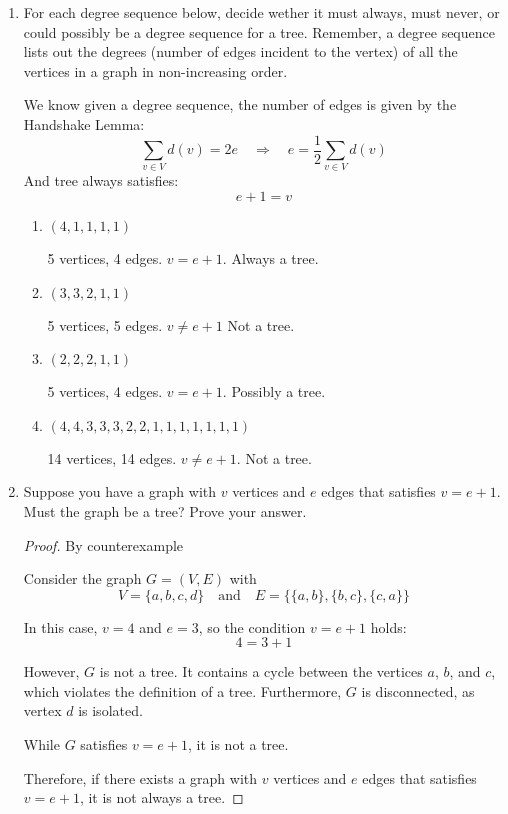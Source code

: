 \documentclass[11pt, letterpaper, includehead]{article}
\theoremstyle{plain}
\theoremstyle{mydefinition}
\theoremstyle{myproperty}
\begin{document}
\begin{enumerate}[label=\textbf{\arabic*}., leftmargin=*]
    \item For each degree sequence below, decide wether it must always, must never, or could possibly be a degree sequence for a tree. Remember, a degree sequence lists out the degrees (number of edges incident to the vertex) of all the vertices in a graph in non-increasing order.
    
    We know given a degree sequence, the number of edges is given by the Handshake Lemma:
        \[
            \sum_{v \in V} d(v) = 2e \quad \Rightarrow \quad e = \frac{1}{2} \sum_{v \in V} d(v)
        \]
    And tree always satisfies:
        \[e + 1 = v\]

    \begin{enumerate}[label=(\alph*)]
        \item $(4, 1, 1, 1, 1)$
        
        5 vertices, 4 edges. $v = e + 1$. Always a tree. 
        \item $(3, 3, 2, 1, 1)$

        5 vertices, 5 edges. $v \neq e + 1$ Not a tree.
        \item $(2, 2, 2, 1, 1)$
        
        5 vertices, 4 edges. $v = e + 1$. Possibly a tree.
        \item $(4, 4, 3, 3, 3, 2, 2, 1, 1, 1, 1, 1, 1, 1)$

        14 vertices, 14 edges. $v \neq e + 1$. Not a tree. 
    \end{enumerate}

    \item Suppose you have a graph with $v$ vertices and $e$ edges that satisfies $v = e + 1$. Must the graph be a tree? Prove your answer.
    \begin{proof} By counterexample

        Consider the graph $G = (V, E)$ with
        \[V = \{a, b, c, d\} \quad \text{and} \quad E = \{\{a, b\}, \{b, c\}, \{c, a\}\}\]

        In this case, $v = 4$ and $e = 3$, so the condition $v = e + 1$ holds:  
        \[4 = 3 + 1\]

        However, $G$ is not a tree. It contains a cycle between the vertices $a$, $b$, and $c$, which violates the definition of a tree. Furthermore, $G$ is disconnected, as vertex $d$ is isolated.

        While $G$ satisfies $v = e + 1$, it is not a tree.

        Therefore, if there exists a graph with $v$ vertices and $e$ edges that satisfies $v = e + 1$, it is not always a tree.
    \end{proof}


\end{enumerate}
\end{document}
